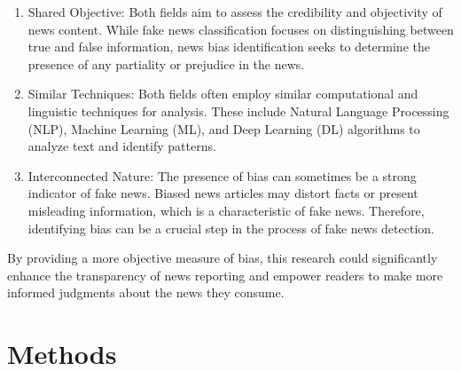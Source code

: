 \documentclass[11pt,a4paper]{article}
\begin{document}
\begin{enumerate}
  \item Shared Objective: Both fields aim to assess the credibility and objectivity of news content. While fake news classification focuses on distinguishing between true and false information, news bias identification seeks to determine the presence of any partiality or prejudice in the news.
  \item Similar Techniques: Both fields often employ similar computational and linguistic techniques for analysis. These include Natural Language Processing (NLP), Machine Learning (ML), and Deep Learning (DL) algorithms to analyze text and identify patterns.
  \item Interconnected Nature: The presence of bias can sometimes be a strong indicator of fake news. Biased news articles may distort facts or present misleading information, which is a characteristic of fake news. Therefore, identifying bias can be a crucial step in the process of fake news detection.
\end{enumerate}
By providing a more objective measure of bias, this research could significantly enhance the transparency of news reporting and empower readers to make more informed judgments about the news they consume. 

\section{Methods}
\end{document}
